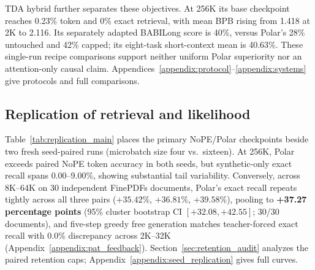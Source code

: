 \documentclass{article}
\newcommand{\rev}[1]{{\color{revcolor}#1}}
\begin{document}
TDA hybrid further separates these objectives. At 256K its base checkpoint reaches 0.23\% token and 0\% exact retrieval, with mean BPB rising from 1.418 at 2K to 2.116. Its separately adapted BABILong score is 40\%, versus Polar's 28\% untouched and 42\% capped; its eight-task short-context mean is 40.63\%. These single-run recipe comparisons support neither uniform Polar superiority nor an attention-only causal claim. Appendices~\ref{appendix:protocol}--\ref{appendix:systems} give protocols and full comparisons.

\subsection{Replication of retrieval and likelihood}
Table~\ref{tab:replication_main} places the primary NoPE/Polar checkpoints beside two fresh seed-paired runs (microbatch size four vs.\ sixteen). At 256K, Polar exceeds paired NoPE token accuracy in both seeds, \rev{but synthetic-only exact recall spans 0.00--9.00\%, showing substantial tail variability. Conversely, across 8K--64K on 30 independent FinePDFs documents, Polar's exact recall repeats tightly across all three pairs ($+35.42\%$, $+36.81\%$, $+39.58\%$), pooling to \textbf{+37.27 percentage points} (95\% cluster bootstrap CI $[+32.08,+42.55]$; 30/30 documents), and five-step greedy free generation matches teacher-forced exact recall with 0.0\% discrepancy across 2K--32K (Appendix~\ref{appendix:pat_feedback}).} Section~\ref{sec:retention_audit} analyzes the paired retention caps; Appendix~\ref{appendix:seed_replication} gives full curves.
\end{document}
